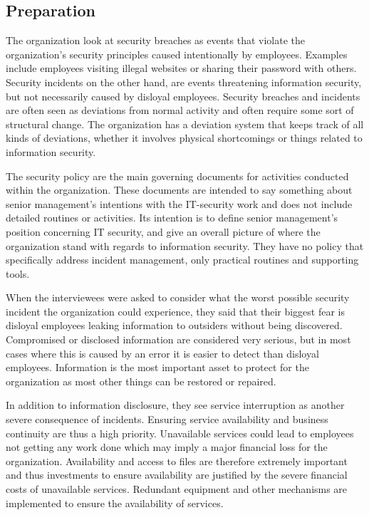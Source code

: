 \subsection{Preparation}
The organization look at security breaches as events that violate the organization's security principles caused intentionally by employees. Examples include employees visiting illegal websites or sharing their password with others. Security incidents on the other hand, are events threatening information security, but not necessarily caused by disloyal employees. Security breaches and incidents are often seen as deviations from normal activity and often require some sort of structural change. The organization has a deviation system that keeps track of all kinds of deviations, whether it involves physical shortcomings or things related to information security.

The security policy are the main governing documents for activities conducted within the organization. These documents are intended to say something about senior management's intentions with the IT-security work and does not include detailed routines or activities. Its intention is to define senior management's position concerning IT security, and give an overall picture of where the organization stand with regards to information security. They have no policy that specifically address incident management, only practical routines and supporting tools.

When the interviewees were asked to consider what the worst possible security incident the organization could experience, they said that their biggest fear is disloyal employees leaking information to outsiders without being discovered. Compromised or disclosed information are considered very serious, but in most cases where this is caused by an error it is easier to detect than disloyal employees. Information is the most important asset to protect for the organization as most other things can be restored or repaired.

In addition to information disclosure, they see service interruption as another severe consequence of incidents. Ensuring service availability and business continuity are thus a high priority. Unavailable services could lead to employees not getting any work done which may imply a major financial loss for the organization. Availability and access to files are therefore extremely important and thus investments to ensure availability are justified by the severe financial costs of unavailable services. Redundant equipment and other mechanisms are implemented to ensure the availability of services. 

